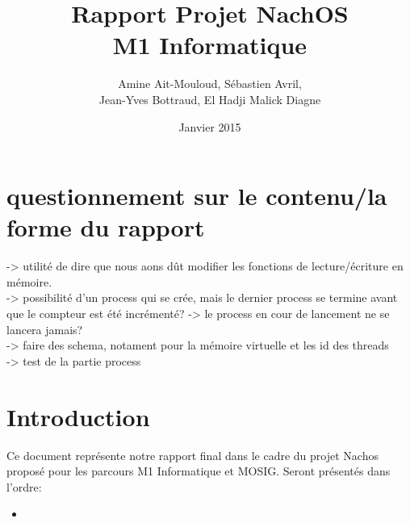 \documentclass{article}
\begin{document}
\title {Rapport Projet NachOS \\ M1 Informatique}
\author{Amine Ait-Mouloud, Sébastien Avril,\\ Jean-Yves Bottraud, El Hadji Malick Diagne}
\date{Janvier 2015}
\maketitle

\section{questionnement sur le contenu/la forme du rapport}
	-> utilité de dire que nous aons dût modifier les fonctions de lecture/écriture en mémoire.
	\\ -> possibilité d'un process qui se crée, mais le dernier process se termine avant que le compteur est été incrémenté? -> le process en cour de lancement ne se lancera jamais?
	\\ -> faire des schema, notament pour la mémoire virtuelle et les id des threads
	\\ -> test de la partie process

\tableofcontents{}
\newpage
\section{Introduction}
	Ce document représente notre rapport final dans le cadre du projet Nachos proposé pour les parcours M1 Informatique et MOSIG.
	Seront présentés dans l'ordre: 
	\begin{itemize}
		\item{}
	\end{itemize}
\end{document}
